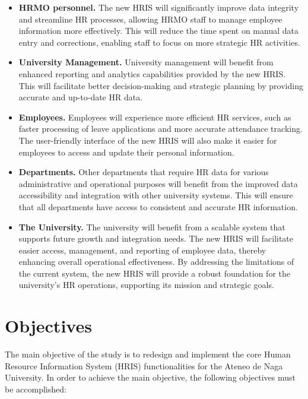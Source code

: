     \begin{itemize}
        \item[] \textbf{HRMO personnel.} The new HRIS will significantly improve data integrity and streamline HR processes, allowing HRMO staff to manage employee information more effectively. This will reduce the time spent on manual data entry and corrections, enabling staff to focus on more strategic HR activities.

        \item[] \textbf{University Management.} University management will benefit from enhanced reporting and analytics capabilities provided by the new HRIS. This will facilitate better decision-making and strategic planning by providing accurate and up-to-date HR data.

        \item[] \textbf{Employees.} Employees will experience more efficient HR services, such as faster processing of leave applications and more accurate attendance tracking. The user-friendly interface of the new HRIS will also make it easier for employees to access and update their personal information.

        \item[] \textbf{Departments.} Other departments that require HR data for various administrative and operational purposes will benefit from the improved data accessibility and integration with other university systems. This will ensure that all departments have access to consistent and accurate HR information.

        \item[] \textbf{The University.} The university will benefit from a scalable system that supports future growth and integration needs. The new HRIS will facilitate easier access, management, and reporting of employee data, thereby enhancing overall operational effectiveness. By addressing the limitations of the current system, the new HRIS will provide a robust foundation for the university's HR operations, supporting its mission and strategic goals.
    \end{itemize}
    
\section{Objectives}

    The main objective of the study is to redesign and implement the core Human Resource Information System (HRIS) functionalities for the Ateneo de Naga University. In order to achieve the main objective, the following objectives must be accomplished:

